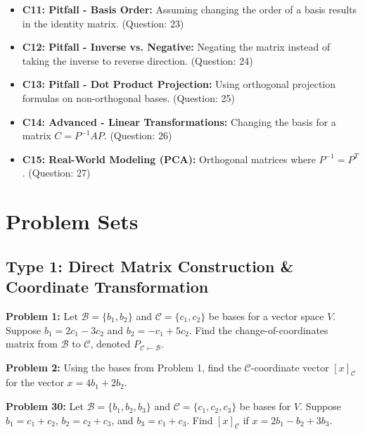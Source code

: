 \documentclass[11pt]{article}
\begin{document}
\begin{itemize}
    \item \textbf{C11: Pitfall - Basis Order:} Assuming changing the order of a basis results in the identity matrix. (Question: 23)
    \item \textbf{C12: Pitfall - Inverse vs. Negative:} Negating the matrix instead of taking the inverse to reverse direction. (Question: 24)
    \item \textbf{C13: Pitfall - Dot Product Projection:} Using orthogonal projection formulas on non-orthogonal bases. (Question: 25)
    \item \textbf{C14: Advanced - Linear Transformations:} Changing the basis for a matrix $C = P^{-1}AP$. (Question: 26)
    \item \textbf{C15: Real-World Modeling (PCA):} Orthogonal matrices where $P^{-1} = P^T$. (Question: 27)
\end{itemize}

\newpage

\section{Problem Sets}

\subsection*{Type 1: Direct Matrix Construction \& Coordinate Transformation}
\textbf{Problem 1:} Let $\mathcal{B}=\{b_1, b_2\}$ and $\mathcal{C}=\{c_1, c_2\}$ be bases for a vector space $V$. Suppose $b_1 = 2c_1 - 3c_2$ and $b_2 = -c_1 + 5c_2$. Find the change-of-coordinates matrix from $\mathcal{B}$ to $\mathcal{C}$, denoted $P_{\mathcal{C} \leftarrow \mathcal{B}}$.

\vspace{0.5cm}
\textbf{Problem 2:} Using the bases from Problem 1, find the $\mathcal{C}$-coordinate vector $[x]_{\mathcal{C}}$ for the vector $x = 4b_1 + 2b_2$.

\vspace{0.5cm}
\textbf{Problem 30:} Let $\mathcal{B} = \{b_1, b_2, b_3\}$ and $\mathcal{C} = \{c_1, c_2, c_3\}$ be bases for $V$. Suppose $b_1 = c_1+c_2$, $b_2 = c_2+c_3$, and $b_3 = c_1+c_3$. Find $[x]_{\mathcal{C}}$ if $x = 2b_1 - b_2 + 3b_3$.
\end{document}
